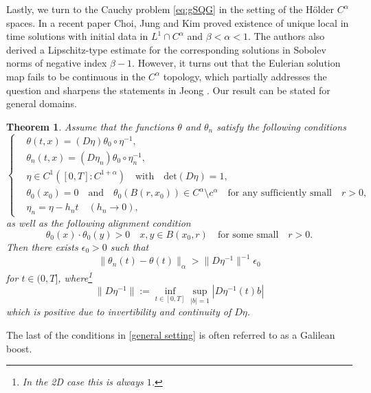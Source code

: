 \documentclass[11pt]{amsart}
\newtheorem{theorem}{Theorem}%
\numberwithin{equation}{section}
\begin{document}
Lastly, we turn to the Cauchy problem \eqref{eq:gSQG} 
in the setting of the H\"older $C^\alpha$ spaces. 
In a recent paper Choi, Jung and Kim \cite{CJK25} 
proved existence of unique local in time solutions 
with initial data in $L^1\cap C^\alpha$ and $\beta<\alpha<1$. 
The authors also derived a Lipschitz-type estimate for 
the corresponding solutions in Sobolev norms 
of negative index $\beta-1$. 
However, it turns out that the Eulerian solution map 
fails to be continuous in the $C^\alpha$ topology, 
which partially addresses the question and sharpens 
the statements in Jeong \cite{I-JJ}. 
Our result can be stated for general domains. 
% 
\begin{theorem} \label{holder case} 
Assume that the functions $\theta$ and $\theta_n$ satisfy 
the following conditions 
% 
\begin{equation} \label{general setting} 
\begin{cases} 
&\theta(t,x)=(D\eta)\theta_0\circ\eta^{-1}, 
\\ 
&\theta_n(t,x)=(D\eta_n)\theta_0\circ\eta^{-1}_n, 
\\ 
&\eta\in C^1([0,T]:C^{1+\alpha}) 
\quad \text{with} \quad \text{det}(D\eta)=1, 
\\ 
&\theta_0(x_0)=0 
\quad \text{and} \quad 
\theta_0(B(r,x_0))\in C^\alpha\setminus c^\alpha 
\quad \text{for any sufficiently small} \quad r>0, 
\\ 
&\eta_n=\eta-h_nt 
\quad (h_n\to 0), 
\end{cases} 
\end{equation} 
% 
as well as the following alignment condition 
% 
\begin{equation}\label{alignment}
\theta_0(x)\cdot\theta_0(y)>0 
\quad x,y\in B(x_0,r) \quad \text{for some small} \quad r>0.
\end{equation} 
% 
Then there exists $\epsilon_0>0$ such that 
$$ 
\|\theta_n(t)-\theta(t)\|_\alpha>\|D\eta^{-1}\|^{-1}\epsilon_0 
$$ 
for $t\in(0,T]$,
where\footnote{In the 2D case this is always $1$.} 
\begin{equation}\label{lower bound}
\|D\eta^{-1}\|:=\inf_{t\in[0,T]}\sup_{|b|=1}|D\eta^{-1}(t)b|
\end{equation}
which is positive due to invertibility and continuity of $D\eta$.
\end{theorem} 
% 
\noindent 
The last of the conditions in \eqref{general setting} 
is often referred to as a Galilean boost. 

\medskip 
\end{document}
